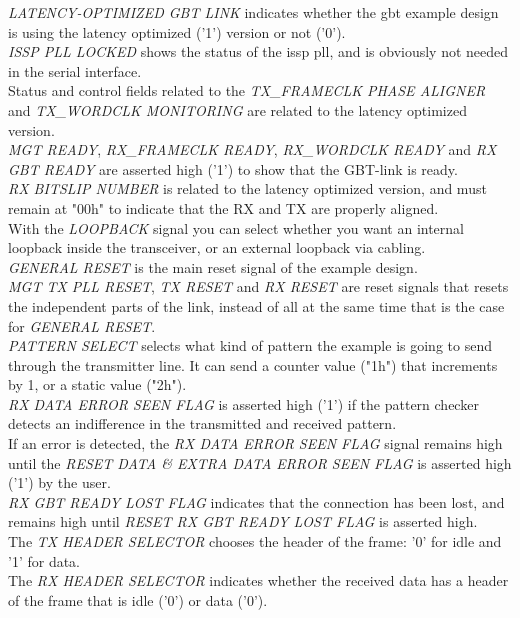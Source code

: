 \documentclass[main.tex]{subfiles}
\begin{document}
\textit{LATENCY-OPTIMIZED GBT LINK} indicates whether the \gls{gbt} example design is using the latency optimized ('1') version or not ('0'). \\
\textit{ISSP PLL LOCKED} shows the status of the issp pll, and is obviously not needed in the serial interface.\\
Status and control fields related to the \textit{TX\_FRAMECLK PHASE ALIGNER} and \textit{TX\_WORDCLK MONITORING} are related to the latency optimized version. \\
\textit{MGT READY}, \textit{RX\_FRAMECLK READY}, \textit{RX\_WORDCLK READY} and \textit{RX GBT READY} are asserted high ('1') to show that the GBT-link is ready. \\
\textit{RX BITSLIP NUMBER} is related to the latency optimized version, and must remain at "00h" to indicate that the RX and TX are properly aligned. \\
With the \textit{LOOPBACK} signal you can select whether you want an internal loopback inside the transceiver, or an external loopback via cabling. \\
\textit{GENERAL RESET} is the main reset signal of the example design. \\
\textit{MGT TX PLL RESET}, \textit{TX RESET} and \textit{RX RESET} are reset signals that resets the independent parts of the link, instead of all at the same time that is the case for \textit{GENERAL RESET}. \\
\textit{PATTERN SELECT} selects what kind of pattern the example is going to send through the transmitter line. It can send a counter value ("1h") that increments by 1, or a static value ("2h").\\ 
\textit{RX DATA ERROR SEEN FLAG} is asserted high ('1') if the pattern checker detects an indifference in the transmitted and received pattern. \\
If an error is detected, the \textit{RX DATA ERROR SEEN FLAG} signal remains high until the \textit{RESET DATA \& EXTRA DATA ERROR SEEN FLAG} is asserted high ('1') by the user. \\
\textit{RX GBT READY LOST FLAG} indicates that the connection has been lost, and remains high until \textit{RESET RX GBT READY LOST FLAG} is asserted high. \\
The \textit{TX HEADER SELECTOR} chooses the header of the frame: '0' for idle and '1' for data. \\
The \textit{RX HEADER SELECTOR} indicates whether the received data has a header of the frame that is idle ('0') or data ('0').\\
\end{document}
